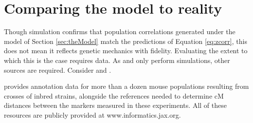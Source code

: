 \documentclass{article}
\newcommand{\code}[1]{\texttt{#1}}
\newcommand{\ve}[1]{\mathbf{#1}}           %
\begin{document}



\section{Comparing the model to reality} \label{sec:model2real}

Though simulation confirms that population correlations generated under the model of Section \ref{sec:theModel} match the predictions of Equation \ref{eq:zcorr}, this does not mean it reflects genetic mechanics with fidelity. Evaluating the extent to which this is the case requires data. As \cite{LanderBotstein1989} and \cite{cheverud2001} only perform simulations, other sources are required. Consider \cite{cheverudetal2001} and \cite{bultetal2019mouse}.

\cite{bultetal2019mouse} provides annotation data for more than a dozen mouse populations resulting from crosses of inbred strains, alongside the references needed to determine cM distances between the markers measured in these experiments. All of these resources are publicly provided at www.informatics.jax.org.
\end{document}
